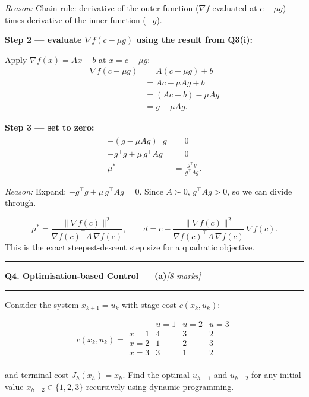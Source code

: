 \documentclass[10pt,a4paper]{article}
\newcommand{\sectitle}[2]{%
  \vspace{10pt}\noindent\rule{\linewidth}{0.8pt}\par\vspace{2pt}%
  {\large\textbf{#1}\hfill\normalsize\textit{[#2 marks]}}\par
  \vspace{2pt}\rule{\linewidth}{0.4pt}\vspace{4pt}}
\newcommand{\reason}[1]{%
  \begin{mdframed}[backgroundcolor=reasonbg, linewidth=0.4pt,
    innertopmargin=3pt, innerbottommargin=3pt,
    innerleftmargin=6pt, innerrightmargin=6pt]
    \small\textit{Reason:} \small #1
  \end{mdframed}\vspace{2pt}}
\newenvironment{resultbox}{%
  \begin{mdframed}[backgroundcolor=boxbg, linewidth=0.6pt,
    innertopmargin=5pt, innerbottommargin=5pt,
    innerleftmargin=8pt, innerrightmargin=8pt]
}{\end{mdframed}}
\begin{document}
\reason{Chain rule: derivative of the outer function ($\nabla f$ evaluated at $c-\mu g$)
        times derivative of the inner function ($-g$).}

\textbf{Step 2 --- evaluate $\nabla f(c-\mu g)$ using the result from Q3(i):}

Apply $\nabla f(x) = Ax + b$ at $x = c - \mu g$:
\begin{align*}
  \nabla f(c-\mu g) &= A(c-\mu g) + b \\
                    &= Ac - \mu Ag + b \\
                    &= (Ac + b) - \mu Ag \\
                    &= g - \mu Ag.
\end{align*}

\textbf{Step 3 --- set to zero:}
\begin{align*}
  -(g-\mu Ag)^\top g &= 0 \\
  -g^\top g + \mu\,g^\top Ag &= 0 \\
  \mu^* &= \frac{g^\top g}{g^\top Ag}.
\end{align*}

\reason{Expand: $-g^\top g + \mu\,g^\top Ag = 0$.
        Since $A\succ 0$, $g^\top Ag>0$, so we can divide through.}

\begin{resultbox}
\[
  \mu^* = \frac{\|\nabla f(c)\|^2}{\nabla f(c)^\top A\,\nabla f(c)},
  \qquad
  d = c - \frac{\|\nabla f(c)\|^2}{\nabla f(c)^\top A\,\nabla f(c)}\,\nabla f(c).
\]
This is the exact steepest-descent step size for a quadratic objective.
\end{resultbox}

\newpage
\sectitle{Q4. Optimisation-based Control --- (a)}{8}

\noindent Consider the system $x_{k+1} = u_k$ with stage cost $c(x_k, u_k)$:

\[
  c(x_k,u_k) =
  \begin{array}{c|ccc}
             & u=1 & u=2 & u=3 \\\hline
    x=1      &  4  &  3  &  2  \\
    x=2      &  1  &  2  &  3  \\
    x=3      &  3  &  1  &  2  \\
  \end{array}
\]

\noindent and terminal cost $J_h(x_h) = x_h$. Find the optimal $u_{h-1}$ and $u_{h-2}$
for any initial value $x_{h-2}\in\{1,2,3\}$ recursively using dynamic programming.
\end{document}
